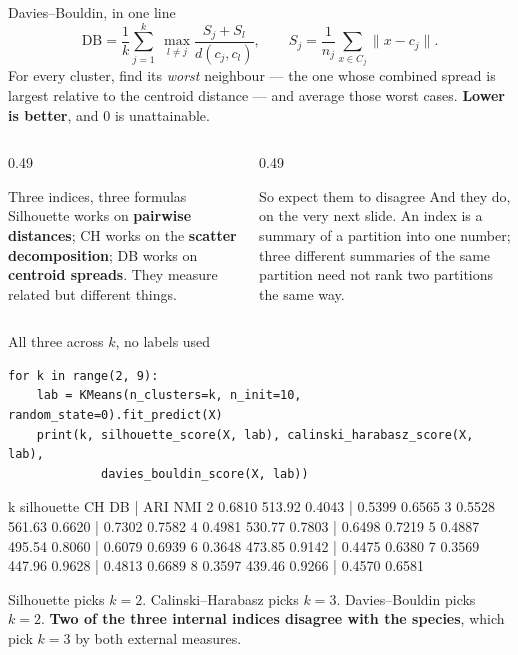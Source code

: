 \documentclass[aspectratio=169]{beamer}
\begin{document}
\begin{frame}[fragile,shrink=8]{Davies--Bouldin, in one line}
  \[
    \mathrm{DB} = \frac{1}{k}\sum_{j=1}^{k}\ \max_{l \neq j}
    \frac{S_j + S_l}{d(c_j, c_l)},
    \qquad
    S_j = \frac{1}{n_j}\sum_{x \in C_j} \lVert x - c_j \rVert .
  \]
  For every cluster, find its \emph{worst} neighbour --- the one whose
  combined spread is largest relative to the centroid distance --- and
  average those worst cases. \textbf{Lower is better}, and $0$ is
  unattainable.
  \begin{columns}[T]
    \begin{column}{0.49\textwidth}
      \begin{block}{Three indices, three formulas}
        Silhouette works on \textbf{pairwise distances}; CH works on the
        \textbf{scatter decomposition}; DB works on \textbf{centroid
        spreads}. They measure related but different things.
      \end{block}
    \end{column}
    \begin{column}{0.49\textwidth}
      \begin{alertblock}{So expect them to disagree}
        And they do, on the very next slide. An index is a summary of a
        partition into one number; three different summaries of the same
        partition need not rank two partitions the same way.
      \end{alertblock}
    \end{column}
  \end{columns}
\end{frame}

\begin{frame}[fragile,shrink=9]{All three across $k$, no labels used}
\begin{lstlisting}
for k in range(2, 9):
    lab = KMeans(n_clusters=k, n_init=10, random_state=0).fit_predict(X)
    print(k, silhouette_score(X, lab), calinski_harabasz_score(X, lab),
             davies_bouldin_score(X, lab))
\end{lstlisting}
\begin{outblk}
  k   silhouette           CH           DB |        ARI        NMI
  2       0.6810       513.92       0.4043 |     0.5399     0.6565
  3       0.5528       561.63       0.6620 |     0.7302     0.7582
  4       0.4981       530.77       0.7803 |     0.6498     0.7219
  5       0.4887       495.54       0.8060 |     0.6079     0.6939
  6       0.3648       473.85       0.9142 |     0.4475     0.6380
  7       0.3569       447.96       0.9628 |     0.4813     0.6689
  8       0.3597       439.46       0.9266 |     0.4570     0.6581
\end{outblk}
  \begin{center}\small
    Silhouette picks $k=2$. Calinski--Harabasz picks $k=3$. Davies--Bouldin
    picks $k=2$. \textbf{Two of the three internal indices disagree with the
    species}, which pick $k=3$ by both external measures.
  \end{center}
\end{frame}
\end{document}
